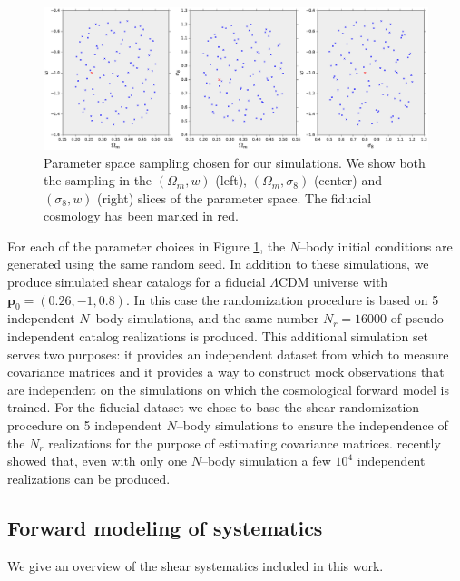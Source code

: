 \documentclass[reprint,aps,prd,superscriptaddress,showkeys,showpacs]{revtex4-1}
\newcommand{\bb}[1]{\mathbf{#1}}
\begin{document}
\begin{figure}
\includegraphics[scale=0.35]{Figures/design.eps}
\caption{Parameter space sampling chosen for our simulations. We show both the sampling in the $(\Omega_m,w)$ (left), $(\Omega_m,\sigma_8)$ (center) and $(\sigma_8,w)$ (right) slices of the parameter space. The fiducial cosmology has been marked in red.}
\label{fig:simdesign}
\end{figure}
%
For each of the parameter choices in Figure \ref{fig:simdesign}, the $N$--body initial conditions are generated using the same random seed. In addition to these simulations, we produce simulated shear catalogs for a fiducial $\Lambda$CDM universe with $\bb{p}_0=(0.26,-1,0.8)$. In this case the randomization procedure is based on 5 independent $N$--body simulations, and the same number $N_r=16000$ of pseudo--independent catalog realizations is produced. This additional simulation set serves two purposes: it provides an independent dataset from which to measure covariance matrices and it provides a way to construct mock observations that are independent on the simulations on which the cosmological forward model is trained. For the fiducial dataset we chose to base the shear randomization procedure on 5 independent $N$--body simulations to ensure the independence of the $N_r$ realizations for the purpose of estimating covariance matrices. \citep{PetriVariance} recently showed that, even with only one $N$--body simulation a few $10^4$ independent realizations can be produced.   


\subsection{Forward modeling of systematics}
We give an overview of the shear systematics included in this work. 
\end{document}
